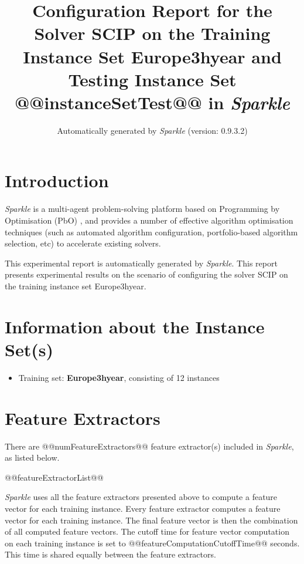 \documentclass[british]{article}
\title{Configuration Report for the Solver SCIP on the Training Instance Set Europe\textunderscore 3h\textunderscore year \iftest and Testing Instance Set @@instanceSetTest@@ \fi in \emph{Sparkle} }
\author{ Automatically generated by \emph{Sparkle} (version: 0.9.3.2) }
\newif\iftest
\newif\iffeatures
\begin{document}
\maketitle %


\section{Introduction}
\label{sec:Introduction}

\emph{Sparkle} \cite{Hoos15} is a multi-agent problem-solving platform based on Programming by Optimisation (PbO) \cite{Hoos12}, and provides a number of effective algorithm optimisation techniques (such as automated algorithm configuration, portfolio-based algorithm selection, etc) to accelerate existing solvers.

This experimental report is automatically generated by \emph{Sparkle}. This report presents experimental results on the scenario of configuring the solver SCIP on the training instance set Europe\textunderscore 3h\textunderscore year\iftest~and evaluating it on the testing instance set @@instanceSetTest@@\fi.


\section{Information about the Instance Set(s)}

\begin{itemize}
\item Training set: \textbf{Europe\textunderscore 3h\textunderscore year}, consisting of 12 instances
\iftest\item \textbf{@@instanceSetTest@@}, consisting of @@numInstanceInTestingInstanceSet@@ instances\fi
\end{itemize}


\iffeatures
    \section{Feature Extractors}
        There are @@numFeatureExtractors@@ feature extractor(s) included in \emph{Sparkle}, as listed below.

        \begin{enumerate}
        @@featureExtractorList@@
        \end{enumerate}

        \emph{Sparkle} uses all the feature extractors presented above to compute a feature vector for each training instance. Every feature extractor computes a feature vector for each training instance. The final feature vector is then the combination of all computed feature vectors. The cutoff time for feature vector computation on each training instance is set to @@featureComputationCutoffTime@@ seconds. This time is shared equally between the feature extractors.
\end{document}
